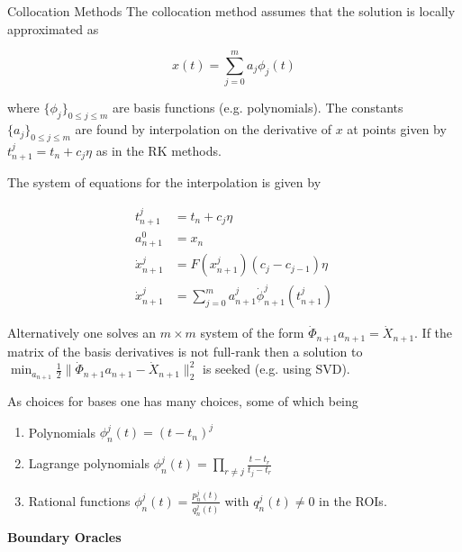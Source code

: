 \documentclass{beamer}
\begin{document}
\begin{frame}[allowframebreaks]{Collocation Methods}
    The collocation method assumes that the solution is locally approximated as 
    
    \begin{equation}
        x(t) = \sum_{j = 0}^m a_j \phi_j(t)
    \end{equation}

    where $\{ \phi_j \}_{0 \le j \le m}$ are basis functions (e.g. polynomials). 
    The constants $ \{ a_j \}_{0 \le j \le m}$ are found by interpolation on the derivative of $x$ at points given by $t_{n + 1}^j = t_n + c_j \eta$ as in the RK methods. 
    
    \framebreak
    
    The system of equations for the interpolation is given by 
    
    \begin{align*}
        t_{n + 1}^j &= t_n + c_j \eta \\
        a_{n + 1}^0 & = x_n \\
        \dot x_{n + 1}^j & = F(x_{n + 1}^j) (c_j - c_{j -1}) \eta \\
        \dot x_{n + 1}^j & = \sum_{j = 0}^m a_{n + 1}^j \dot \phi_{n + 1}^j(t_{n + 1}^j)
    \end{align*}

    Alternatively one solves an $m \times m$ system of the form $\dot \Phi_{n + 1} a_{n+1} = \dot X_{n + 1}$. If the matrix of the basis derivatives is not full-rank then a solution to $\min_{a_{n + 1}} \frac 1 2  \| \dot \Phi_{n + 1} a_{n+1} - \dot X_{n + 1}  \|_2^2$ is seeked (e.g. using SVD).

    \framebreak
    
    As choices for bases one has many choices, some of which being
    
    \begin{enumerate}
        \item Polynomials $\phi_n^j(t) = (t - t_n)^j$ 
        \item Lagrange polynomials $\phi_n^j(t) = \prod_{r \neq j} \frac {t - t_r} {t_j - t_r}$
        \item Rational functions $\phi_n^j(t) = \frac {p_n^j(t)} {q_n^j(t)}$ with $q_n^j (t) \neq 0$ in the ROIs. 
     \end{enumerate}

\end{frame}

\begin{frame}{}
    \vfill
    \centering
    \Large 
    \textbf{Boundary Oracles}
    \vfill
    
\end{frame}
\end{document}
